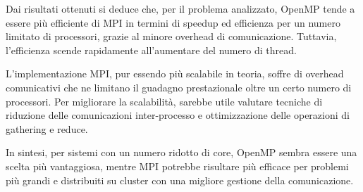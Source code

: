\documentclass[letterpaper,11pt,leqno]{article}
\begin{document}
Dai risultati ottenuti si deduce che, per il problema analizzato, OpenMP tende a essere più efficiente di MPI in termini di speedup ed efficienza per un numero limitato di processori, grazie al minore overhead di comunicazione. Tuttavia, l'efficienza scende rapidamente all'aumentare del numero di thread.

L'implementazione MPI, pur essendo più scalabile in teoria, soffre di overhead comunicativi che ne limitano il guadagno prestazionale oltre un certo numero di processori. Per migliorare la scalabilità, sarebbe utile valutare tecniche di riduzione delle comunicazioni inter-processo e ottimizzazione delle operazioni di gathering e reduce.

In sintesi, per sistemi con un numero ridotto di core, OpenMP sembra essere una scelta più vantaggiosa, mentre MPI potrebbe risultare più efficace per problemi più grandi e distribuiti su cluster con una migliore gestione della comunicazione.
\end{document}
